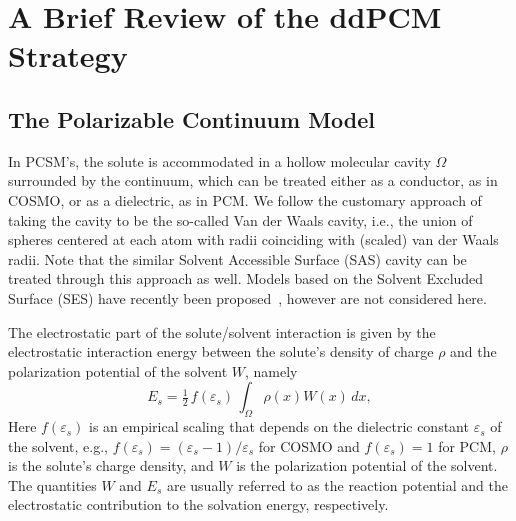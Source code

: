 \section{A Brief Review of the ddPCM Strategy}\label{sec:review}

\subsection{The Polarizable Continuum Model}
In PCSM's, the solute is accommodated in a hollow molecular cavity $\Omega$ surrounded by the continuum, which can be treated either as a conductor, as in COSMO, or as a dielectric, as in PCM. We follow the customary approach of taking the cavity to be the so-called Van der Waals cavity\cite{ReviewPCM_2005}, i.e., the union of spheres centered at each atom with radii coinciding with (scaled) van der Waals radii. Note that the similar Solvent Accessible Surface (SAS) cavity can be treated through this approach as well. Models based on the Solvent Excluded Surface (SES) have recently been proposed~\cite{Harbrecht2011,quan2017polarizable,C5CP03410H,JCC:JCC21431}, however are not considered here.

The electrostatic part of the solute/solvent interaction is given by the electrostatic interaction energy between the solute's density of charge $\rho$ and the polarization potential of the solvent $W$, namely
\[
E_s = \tfrac{1}{2}\, f(\varepsilon_s)\,\int_\Omega \rho(x) W(x) \, dx,
\]
Here $f(\varepsilon_s)$ is an empirical scaling that depends on the dielectric constant $\varepsilon_s$ of the solvent, e.g., $f(\varepsilon_s) = (\varepsilon_s - 1)/\varepsilon_s$ for COSMO and $f(\varepsilon_s) = 1$ for PCM, $\rho$ is the solute's charge density, and $W$ is the polarization potential of the solvent. The quantities $W$ and $E_s$ are usually referred to as the reaction potential and the electrostatic contribution to the solvation energy, respectively. 

